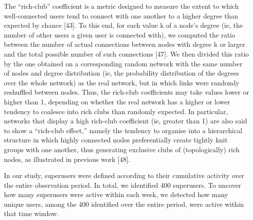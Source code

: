 The “rich-club” coefficient is a metric designed to measure the extent to which well-connected users tend to connect with one another to a higher degree than expected by chance [43]. To this end, for each value k of a node’s degree (ie, the number of other users a given user is connected with), we computed the ratio between the number of actual connections between nodes with degree k or larger and the total possible number of such connections [47]. We then divided this ratio by the one obtained on a corresponding random network with the same number of nodes and degree distribution (ie, the probability distribution of the degrees over the whole network) as the real network, but in which links were randomly reshuffled between nodes. Thus, the rich-club coefficients may take values lower or higher than 1, depending on whether the real network has a higher or lower tendency to coalesce into rich clubs than randomly expected. In particular, networks that display a high rich-club coefficient (ie, greater than 1) are also said to show a “rich-club effect,” namely the tendency to organise into a hierarchical structure in which highly connected nodes preferentially create tightly knit groups with one another, thus generating exclusive clubs of (topologically) rich nodes, as illustrated in previous work [48].

In our study, superusers were defined according to their cumulative activity over the entire observation period. In total, we identified 400 superusers. To uncover how many superusers were active within each week, we detected how many unique users, among the 400 identified over the entire period, were active within that time window.

